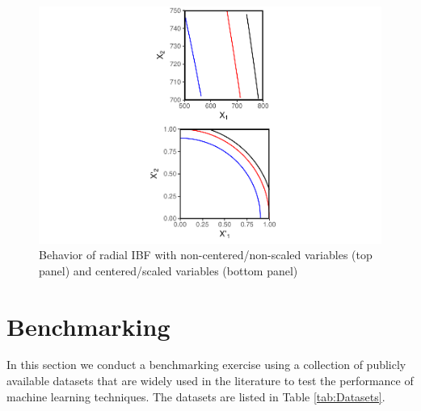 \documentclass[]{elsarticle} %
\makeatletter
\def\maxwidth{\ifdim\Gin@nat@width>\linewidth\linewidth
\else\Gin@nat@width\fi}
\let\Oldincludegraphics\includegraphics
\renewcommand{\includegraphics}[1]{\Oldincludegraphics[width=\maxwidth]{#1}}
\makeatother
\begin{document}
\begin{figure}[htbp]
\centering
\includegraphics{Trees_with_Base_Functions_files/figure-latex/fig7-curvature-1.pdf}
\caption{\label{fig:fig7-curvature}Behavior of radial IBF with
non-centered/non-scaled variables (top panel) and centered/scaled
variables (bottom panel)}
\end{figure}

\hypertarget{benchmarking}{\section{Benchmarking}\label{benchmarking}}

In this section we conduct a benchmarking exercise using a collection of
publicly available datasets that are widely used in the literature to
test the performance of machine learning techniques. The datasets are
listed in Table \ref{tab:Datasets}.

\begin{table}

\caption{\label{tab:dataset-description}\label{tab:Datasets}Datasets for Benchmarking Experiment}
\centering
{}
\end{table}
\end{document}
